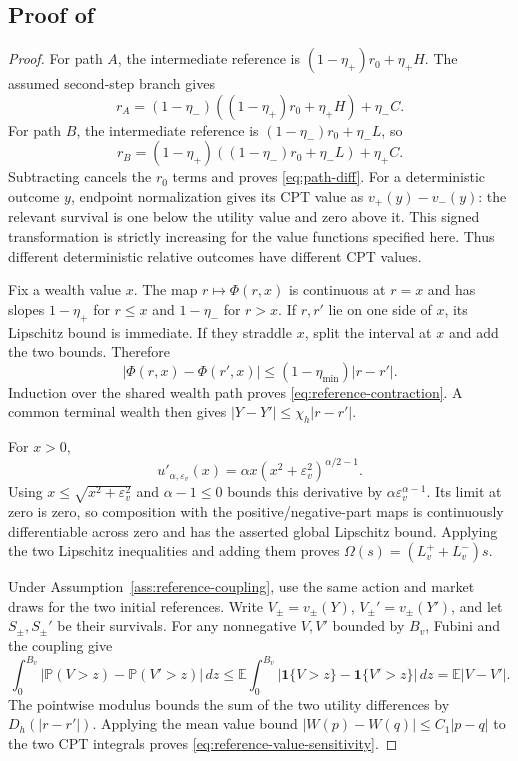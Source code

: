 \documentclass[11pt]{article}
\newcommand{\E}{\mathbb E}
\newcommand{\Pp}{\mathbb P}
\newcommand{\1}{\mathbf 1}
\newcommand{\eps}{\varepsilon}
\theoremstyle{definition}
\begin{document}
\subsection{Proof of \texorpdfstring{}{the reference proposition}}
\begin{proof}
For path $A$, the intermediate reference is $(1-\eta_+)r_0+\eta_+H$. The assumed second-step branch gives
\[
 r_A=(1-\eta_-)((1-\eta_+)r_0+\eta_+H)+\eta_-C.
\]
For path $B$, the intermediate reference is $(1-\eta_-)r_0+\eta_-L$, so
\[
 r_B=(1-\eta_+)((1-\eta_-)r_0+\eta_-L)+\eta_+C.
\]
Subtracting cancels the $r_0$ terms and proves \eqref{eq:path-diff}. For a deterministic outcome $y$, endpoint normalization gives its CPT value as $v_+(y)-v_-(y)$: the relevant survival is one below the utility value and zero above it. This signed transformation is strictly increasing for the value functions specified here. Thus different deterministic relative outcomes have different CPT values.

Fix a wealth value $x$. The map $r\mapsto\Phi(r,x)$ is continuous at $r=x$ and has slopes $1-\eta_+$ for $r\le x$ and $1-\eta_-$ for $r>x$. If $r,r'$ lie on one side of $x$, its Lipschitz bound is immediate. If they straddle $x$, split the interval at $x$ and add the two bounds. Therefore
\[
 |\Phi(r,x)-\Phi(r',x)|\le(1-\eta_{\min})|r-r'|.
\]
Induction over the shared wealth path proves \eqref{eq:reference-contraction}. A common terminal wealth then gives $|Y-Y'|\le\chi_h|r-r'|$.

For $x>0$,
\[
 u'_{\alpha,\eps_v}(x)=\alpha x(x^2+\eps_v^2)^{\alpha/2-1}.
\]
Using $x\le\sqrt{x^2+\eps_v^2}$ and $\alpha-1\le0$ bounds this derivative by $\alpha\eps_v^{\alpha-1}$. Its limit at zero is zero, so composition with the positive/negative-part maps is continuously differentiable across zero and has the asserted global Lipschitz bound. Applying the two Lipschitz inequalities and adding them proves $\Omega(s)=(L_v^++L_v^-)s$.

Under Assumption~\ref{ass:reference-coupling}, use the same action and market draws for the two initial references. Write $V_\pm=v_\pm(Y)$, $V_\pm'=v_\pm(Y')$, and let $S_\pm,S_\pm'$ be their survivals. For any nonnegative $V,V'$ bounded by $B_v$, Fubini and the coupling give
\begin{equation}\label{eq:survival-coupling-inequality}
 \int_0^{B_v}|\Pp(V>z)-\Pp(V'>z)|\,dz
 \le \E\int_0^{B_v}|\1\{V>z\}-\1\{V'>z\}|\,dz
 =\E|V-V'|.
\end{equation}
The pointwise modulus bounds the sum of the two utility differences by $D_h(|r-r'|)$. Applying the mean value bound $|W(p)-W(q)|\le C_1|p-q|$ to the two CPT integrals proves \eqref{eq:reference-value-sensitivity}.


\end{proof}
\end{document}
